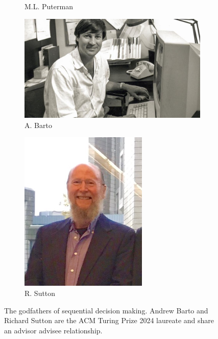 \begin{figure}
\begin{subfigure}[b]{0.22\textwidth}
        \caption{M.L. Puterman}
    \end{subfigure}
    \hfill
    \begin{subfigure}[b]{0.22\textwidth}
        \centering
        \includegraphics[width=1.2\textwidth]{images/images_intro/Barto_1982_umass_amherst.jpg}
        \caption{A. Barto}
    \end{subfigure}
    \hfill
    \begin{subfigure}[b]{0.22\textwidth}
        \centering
        \includegraphics[width=0.67\textwidth]{images/images_intro/sutton.jpg}
        \caption{R. Sutton}
    \end{subfigure}
       \caption{The godfathers of sequential decision making. Andrew Barto and Richard Sutton are the ACM Turing Prize 2024 laureate and share an advisor advisee relationship.}
       \label{fig:rl-pioneers}
\end{figure}

